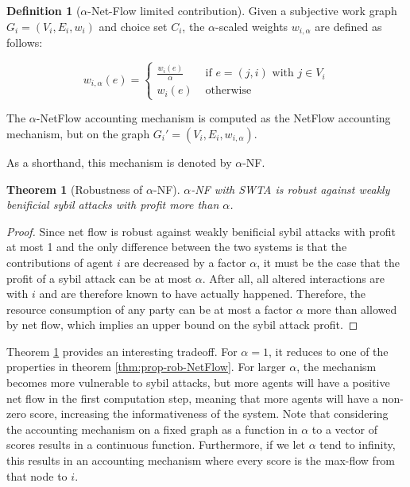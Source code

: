 \documentclass[a4paper,11pt]{book}
\newtheorem{theorem}{Theorem}
\theoremstyle{definition}
\newtheorem{definition}{Definition}
\begin{document}
\begin{definition}[$\alpha$-Net-Flow limited contribution]
    Given a subjective work graph $G_i = (V_i, E_i, w_i)$ and choice set $C_i$, the $\alpha$-scaled
    weights $w_{i,\alpha}$ are defined as follows:

    \begin{equation*}
        w_{i,\alpha}(e) = 
        \begin{cases}
            \frac{w_i(e)}{\alpha} &\mbox{ if } e = (j, i) \mbox{ with } j \in V_i \\
            w_i(e) &\mbox{ otherwise}
        \end{cases}
    \end{equation*}
    
    The $\alpha$-NetFlow accounting mechanism is computed as the NetFlow accounting
    mechanism, but on the graph $G_i' = (V_i, E_i, w_{i,\alpha})$.

    As a shorthand, this mechanism is denoted by $\alpha$-NF.
\end{definition}

\begin{theorem}[Robustness of $\alpha$-NF]
    $\alpha$-NF with SWTA is robust against weakly benificial sybil attacks with
    profit more than $\alpha$.
    \label{thm:sybil-anf}
\end{theorem}

\begin{proof}
    Since net flow is robust against weakly benificial sybil attacks with profit at most
    1 and the only difference between the two systems is that the contributions of
    agent $i$ are decreased by a factor $\alpha$, it must be the case that the profit
    of a sybil attack can be at most $\alpha$. After all, all altered interactions
    are with $i$ and are therefore known to have actually happened. Therefore, the
    resource consumption of any party can be at most a factor $\alpha$ more than allowed
    by net flow, which implies an upper bound on the sybil attack profit.
\end{proof}

Theorem \ref{thm:sybil-anf} provides an interesting tradeoff. For $\alpha=1$, it reduces
to one of the properties in theorem \ref{thm:prop-rob-NetFlow}. For larger $\alpha$,
the mechanism becomes more vulnerable to sybil attacks, but more agents will have
a positive net flow in the first computation step, meaning that more agents will
have a non-zero score, increasing the informativeness of the system. Note
that considering the accounting mechanism on a fixed graph as a function in $\alpha$ to
a vector of scores results in a continuous function. Furthermore, if we let $\alpha$
tend to infinity, this results in an accounting mechanism where every score is the
max-flow from that node to $i$. 
\end{document}
